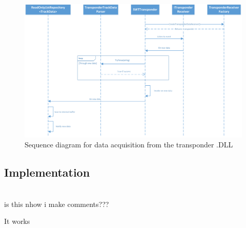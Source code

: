 \begin{figure}
	\centering
	\includegraphics[width=1.0\linewidth]{Images/SWTTransponder}
	\caption{Sequence diagram for data acquisition from the transponder .DLL}
	\label{fig:SWTTransponderSeq}
\end{figure}

\subsection{Implementation}
\\is this nhow i make comments???

It works



\clearpage
